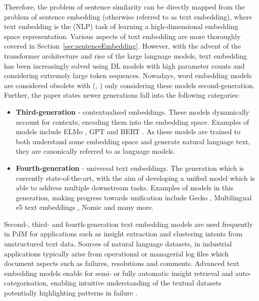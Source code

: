 \documentclass[10pt,oneside]{report}
\renewcommand{\citet}[1]{\citeauthor{#1}, \citeyear{#1}}
\begin{document}
Therefore, the problem of sentence similarity can be directly mapped from the problem of sentence embedding (otherwise referred to as text embedding), where text embedding is the (NLP) task of learning a high-dimensional embedding space representation. Various aspects of text embedding are more thoroughly covered in Section~\ref{sec:sentenceEmbedding}. However, with the advent of the transformer architecture \cite{vaswani2017attention} and rise of the large language models, text embedding has been increasingly solved using DL models with high parameter counts \cite{cao2024recent} and considering extremely large token sequences. Nowadays, word embedding models are considered obsolete with (\citet{cao2024recent}) only considering these models second-generation. Further, the paper states newer generations fall into the following categories:
\begin{itemize}
    \item \textbf{Third-generation} - contextualised embeddings. These models dynamically account for contexts, encoding them into the embedding space. Examples of models include ELMo \cite{sarzynska2021detecting}, GPT \cite{radford2018improving} and BERT \cite{devlin2019bert}. As these models are trained to both understand some embedding space and generate natural language text, they are canonically referred to as language models.
    \item \textbf{Fourth-generation} - universal text embeddings. The generation which is currently state-of-the-art, with the aim of developing a unified model which is able to address multiple downstream tasks. Examples of models in this generation, making progress towards unification include Gecko \cite{lee2024gecko}, Multilingual e5 text embeddings \cite{wang2024multilingual}, Nomic \cite{nussbaum2024nomic} and many more. 
\end{itemize}

Second-, third- and fourth-generation text embedding models are used frequently in PdM for applications such as insight extraction \cite{abijith2023large,usuga2022using} and clustering intents from unstructured text data. Sources of natural language datasets, in industrial applications typically arise from operational or managerial log files which document aspects such as failures, resolutions and comments. Advanced text embedding models enable for semi- or fully automatic insight retrieval and auto-categorisation, enabling intuitive understanding of the textual datasets potentially highlighting patterns in failure \cite{nota2022text}.
\end{document}
